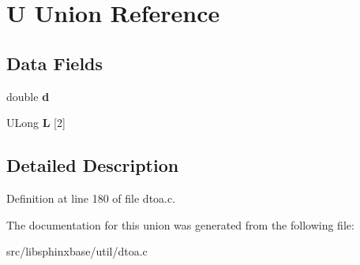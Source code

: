 \section{U Union Reference}
\label{unionU}
\subsection*{Data Fields}
\begin{DoxyCompactItemize}
\item 
double {\bfseries d}\label{unionU_a6379e5194213c802bb8c6786eca8ad50}

\item 
U\+Long {\bfseries L} [2]\label{unionU_aa72022b00fe1608edcdbc0a12e525164}

\end{DoxyCompactItemize}


\subsection{Detailed Description}


Definition at line 180 of file dtoa.\+c.



The documentation for this union was generated from the following file\+:\begin{DoxyCompactItemize}
\item 
src/libsphinxbase/util/dtoa.\+c\end{DoxyCompactItemize}
